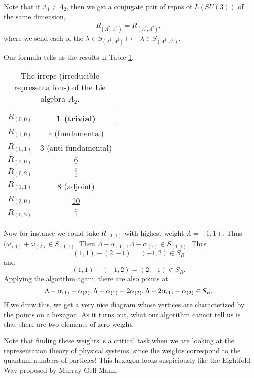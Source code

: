 Note that if $\Lambda_1\neq \Lambda_2$, then we get a conjugate pair of repns of $L(SU(3))$ of the same dimension,
$$R_{(\Lambda^2,\Lambda^1)}=\bar R_{(\Lambda^1,\Lambda^2)},$$
where we send each of the $\lambda \in S_{(\Lambda^1,\Lambda^2)}\mapsto -\lambda \in S_{(\Lambda^2,\Lambda^1)}.$

Our formula tells us the results in Table \ref{tab:a2irreps}.
\begin{table}[]
    \centering
    \begin{tabular}{c|c}
        \\\hline
         $R_{(0,0)}$ & \underline{1} (trivial) \\ \hline
         $R_{(1,0)}$ & \underline{3} (fundamental) \\ \hline
         $R_{(0,1)}$ & $\overline{\underline{3}}$ (anti-fundamental) \\ \hline
         $R_{(2,0)}$ & $\underline{6}$ \\ \hline
         $R_{(0,2)}$ & $\overline{\underline{1}}$ \\ \hline
         $R_{(1,1)}$ & \underline{8} (adjoint) \\ \hline
         $R_{(3,0)}$ & \underline{10} \\ \hline
         $R_{(0,3)}$ & $\overline{\underline{1}}$
    \end{tabular}
    \caption{The irreps (irreducible representations) of the Lie algebra $A_2$.}
    \label{tab:a2irreps}
\end{table}
Now for instance we could take $R_{(1,1)}$ with highest weight $\Lambda=(1,1)$. Thus $(\omega_{(1)}+\omega_{(2)}\in S_{(1,1)}$. Then
$\Lambda-\alpha_{(1)},\Lambda-\alpha_{(2)}\in S_{(1,1)}.$
Thus
$$(1,1)-(2,-1)=(-1,2)\in S_R$$ and $$(1,1)-(-1,2)=(2,-1)\in S_R.$$ Applying the algorithm again, there are also points at
$$\Lambda-\alpha_{(1)}-\alpha_{(2)},\Lambda-\alpha_{(1)}-2\alpha_{(2)},\Lambda-2\alpha_{(1)}-\alpha_{(2)}\in S_R.$$
If we draw this, we get a very nice diagram whose vertices are characterized by the points on a hexagon. As it turns out, what our algorithm cannot tell us is that there are two elements of zero weight.

Note that finding these weights is a critical task when we are looking at the representation theory of physical systems, since the weights correspond to the quantum numbers of particles! This hexagon looks suspiciously like the Eightfold Way proposed by Murray Gell-Mann.

